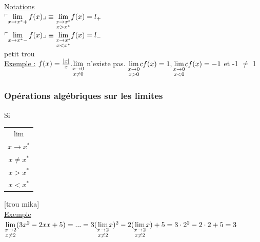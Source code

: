 \documentclass[12pt,a4paper]{article}
\begin{document}
{\underline{Notations}\\
$\ulcorner \lim\limits_{x\to x^*+} f(x)\lrcorner \equiv \underset{x > x^*}{\lim\limits_{x\to x^*}} f(x) = l_+$\\
$\ulcorner \lim\limits_{x\to x^*-} f(x)\lrcorner \equiv \underset{x < x^*}{\lim\limits_{x\to x^*}} f(x) = l_-$\\
petit trou\\
\underline{Exemple :} $f(x) = \frac{|x|}{x}. \underset{x\neq 0}{\lim\limits_{x \to 0}}$ n'existe pas. $\underset{x > 0}{\lim\limits_{x \to 0}}cf(x) = 1, \underset{x < 0}{\lim\limits_{x \to 0}}cf(x) = -1$ et -1 $\neq$ 1
\subsubsection{Opérations algébriques sur les limites}
Si\begin{tabular}{c}
$\lim$ \\ 
$x \to x^*$ \\ 
$x \neq x^*$ \\ 
$x > x^*$ \\ 
$x < x^*$ \\ 
\end{tabular} 

[trou mika]\\
\underline{Exemple} $\underset{x \neq 2}{\lim\limits_{x \to 2}} (3x^2 -2xx +5) = ... = 3 (\underset{x \neq 2}{\lim\limits_{x \to 2}}x)^2 - 2(\underset{x \neq 2}{\lim\limits_{x \to 2}}x) + 5 = 3\cdot 2^2 - 2 \cdot 2 + 5 = 3$

}
\end{document}
